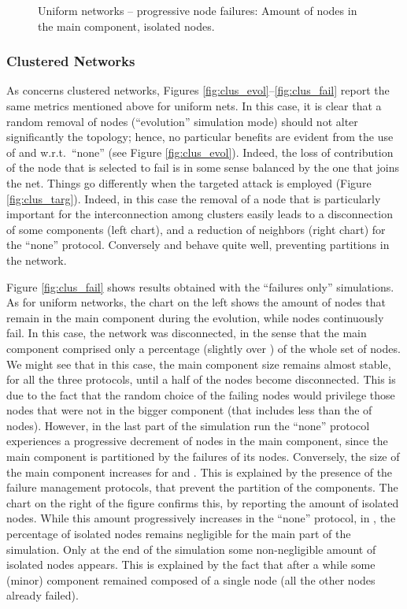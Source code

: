 \documentclass[10pt, conference, compsocconf]{IEEEtran}
\begin{document}
\begin{figure*}[t]
   \centering
      \hspace{1.5cm}
   \caption{Uniform networks -- progressive node failures: Amount of nodes in the main component, isolated nodes.}
   \label{fig:unif_fail}
\end{figure*}

\subsubsection{Clustered Networks}
As concerns clustered networks, Figures \ref{fig:clus_evol}--\ref{fig:clus_fail} report the same metrics mentioned above for uniform nets. In this case, it is clear that a random removal of nodes (``evolution'' simulation mode) should not alter significantly the topology; hence, no particular benefits are evident from the use of  and  w.r.t.~``none'' (see Figure \ref{fig:clus_evol}).
Indeed, the loss of contribution of the node that is selected to fail is in some sense balanced by the one that joins the net.
Things go differently when the targeted attack is employed (Figure \ref{fig:clus_targ}). Indeed, in this case the removal of a node that is particularly important for the interconnection among clusters easily leads to a disconnection of some components (left chart), and a reduction of neighbors (right chart) for the ``none'' protocol. Conversely  and  behave quite well, preventing partitions in the network.

Figure \ref{fig:clus_fail} shows results obtained with the ``failures only'' simulations. As for uniform networks, the chart on the left shows the amount of nodes that remain in the main component during the evolution, while nodes continuously fail.
In this case, the network was disconnected, in the sense that the main component comprised only a percentage (slightly over ) of the whole set of nodes.
We might see that in this case, the main component size remains almost stable, for all the three protocols, until a half of the nodes become disconnected. This is due to the fact that the random choice of the failing nodes would privilege those nodes that were not in the bigger component (that includes less than the  of nodes). However, in the last part of the simulation run the ``none'' protocol experiences a progressive decrement of nodes in the main component, since the main component is partitioned by the failures of its nodes. Conversely, the size of the main component increases for  and . This is explained by the presence of the failure management protocols, that prevent the partition of the components.
The chart on the right of the figure confirms this, by reporting the amount of isolated nodes. While this amount progressively increases in the ``none'' protocol, in ,  the percentage of isolated nodes remains negligible for the main part of the simulation. Only at the end of the simulation some non-negligible amount of isolated nodes appears. This is explained by the fact that after a while some (minor) component remained composed of a single node (all the other nodes already failed).
\end{document}
